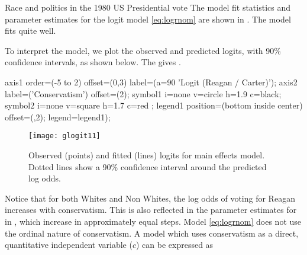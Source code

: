\begin{Example}[reagan]{Race and politics in the 1980 US Presidential vote}
The model fit statistics and parameter estimates for the logit model
\eqref{eq:logrnom} are shown in .
The model fits quite well.
\begin{Output}[htb]
\caption{Vote data: Fit of the nominal main effects model}\label{out:glogit1.1}
\small

\end{Output}

To interpret the model, we plot the observed and predicted logits, with
90\% confidence intervals, as shown below.  The 
gives .
\begin{listing}

axis1 order=(-5 to 2) offset=(0,3)
      label=(a=90 'Logit (Reagan / Carter)');
axis2 label=('Conservatism') offset=(2);
symbol1 i=none v=circle h=1.9 c=black;
symbol2 i=none v=square h=1.7 c=red  ;
legend1 position=(bottom inside center) offset=(,2);
   legend=legend1);
\end{listing}

\begin{figure}[htb]
  \centering
  \texttt{[image: glogit11]}
  \caption[Observed and fitted logits for main effects model]{Observed (points) and fitted (lines) logits for main effects model.  Dotted lines show a 90\% confidence interval around the predicted log odds.}%
  \label{fig:glogit11}
\end{figure}
Notice that for both Whites and Non Whites, the log odds of voting for
Reagan increases with conservatism.  This is also reflected in the
parameter estimates for  in ,
which increase in approximately equal steps.
Model \eqref{eq:logrnom} does not use the ordinal nature of conservatism.
A model which uses conservatism as a direct,
quantitative independent variable ($c$) can be expressed as


\end{Example}
